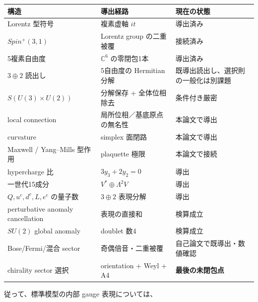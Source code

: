 \documentclass[
  a4paper,
]{ltjsarticle}
\newcounter{none} %
\begin{document}
{\def\LTcaptype{none} %
\begin{longtable}[]{@{}
  >{\raggedright\arraybackslash}p{}
  >{\raggedright\arraybackslash}p{}
  >{\raggedright\arraybackslash}p{}@{}}
\toprule\noalign{}
\begin{minipage}[b]{\linewidth}\raggedright
構造
\end{minipage} & \begin{minipage}[b]{\linewidth}\raggedright
導出経路
\end{minipage} & \begin{minipage}[b]{\linewidth}\raggedright
現在の状態
\end{minipage} \\
\midrule\noalign{}
\endhead
\bottomrule\noalign{}
\endlastfoot
Lorentz 型符号 & 複素虚軸 \(it\) & 導出済み \\
\(Spin^+(3,1)\) & Lorentz group の二重被覆 & 接続済み \\
5複素自由度 & \(\mathbb C^6\) の零閉包1本 & 導出済み \\
\(3\oplus2\) 読出し & 5自由度の Hermitian 分解 &
既導出読出し、選択則の一般化は別課題 \\
\(S(U(3)\times U(2))\) & 分解保存 + 全体位相除去 & 条件付き厳密 \\
local connection & 局所位相／基底原点の無名性 & 本論文で導出 \\
curvature & simplex 面閉路 & 本論文で導出 \\
Maxwell / Yang--Mills 型作用 & plaquette 極限 & 本論文で接続 \\
hypercharge 比 & \(3y_3+2y_2=0\) & 導出 \\
一世代15成分 & \(V^*\oplus\Lambda^2V\) & 導出 \\
\(Q,u^c,d^c,L,e^c\) の量子数 & \(3\oplus2\) 表現分解 & 導出 \\
perturbative anomaly cancellation & 表現の直接和 & 検算成立 \\
\(SU(2)\) global anomaly & doublet 数4 & 検算成立 \\
Bose/Fermi/混合 sector & 奇偶倍音・二重被覆 &
自己論文で既導出・数値確認 \\
chirality sector 選択 & orientation + Weyl + A4 &
\textbf{最後の未閉包点} \\
\end{longtable}
}

従って、標準模型の内部 gauge 表現については、
\end{document}
